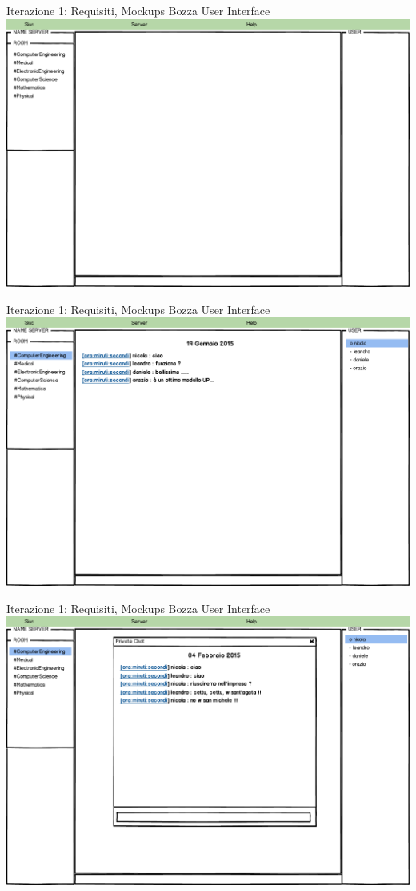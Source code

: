 \documentclass[t]{beamer} %
\begin{document}
\begin{frame} {Iterazione 1: Requisiti, Mockups Bozza User Interface}
    \includegraphics[scale=0.28]{image_mockups/06_snuc_connect.png}{\centering}
\end{frame}

\begin{frame} {Iterazione 1: Requisiti, Mockups Bozza User Interface}
    \includegraphics[scale=0.28]{image_mockups/07_snuc_user_room_ce.png}{\centering}
\end{frame}

\begin{frame} {Iterazione 1: Requisiti, Mockups Bozza User Interface}
    \includegraphics[scale=0.28]{image_mockups/08_snuc_user_room_ce_private.png}{\centering}
\end{frame}
\end{document}
